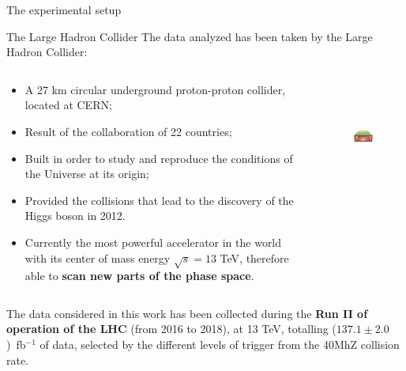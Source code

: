 \documentclass[8pt]{beamer}
\begin{document}
\begin{frame}[standout]
The experimental setup
\end{frame}

\begin{frame}{The Large Hadron Collider}
\justifying
The data analyzed \alert{has been taken by the Large Hadron Collider}:

\begin{columns}
	\begin{column}{0.55	\textwidth}
	\begin{itemize}
\justifying
\item A 27 km circular underground proton-proton collider, located at CERN;
\item Result of the collaboration of 22 countries;
\item Built in order to study and reproduce the conditions of the Universe at its origin;
\item Provided the collisions that lead to the discovery of the Higgs boson in 2012.%
\item Currently the most powerful accelerator in the world with its center of mass energy $\sqrt{s} = 13$ TeV, therefore able to \textbf{scan new parts of the phase space}.
\end{itemize}
	\end{column}
	\begin{column}{0.48\textwidth}
	\begin{figure}[htbp]
\begin{center}
\includegraphics[width=5cm, height=3.6cm]{figs/LHCunderground.png}
\end{center}
\end{figure}
	\end{column}
\end{columns} \vfill

\vspace{10pt}
The data considered in this work has been collected during the \textbf{Run II of operation of the LHC} (from 2016 to 2018), at 13 TeV, totalling ($137.1 \pm 2.0$)~fb$^{-1}$ of data, selected by the different levels of trigger from the 40MhZ collision rate. \vfill
\end{frame} 
\end{document}

